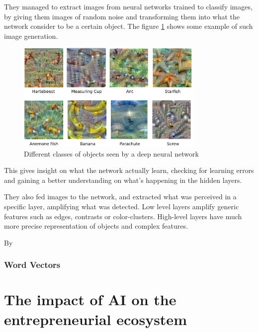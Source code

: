 \documentclass[12pt]{article}
\begin{document}
They managed to extract images from neural networks trained to classify images, by
giving them images of random noise and transforming them into what the network
consider to be a certain object. The figure \ref{fig:classvis} shows some example of
such image generation.

\begin{figure}[h]
    \centering
    \includegraphics[width=0.8\textwidth]{classvis}
    \caption{Different classes of objects seen by a deep neural network}
    \label{fig:classvis}
\end{figure}

This gives insight on what the network actually learn, checking for learning errors
and gaining a better understanding on what's happening in the hidden layers.

They also fed images to the network, and extracted what was perceived in a
specific layer, amplifying what was detected. Low level layers amplify generic
features such as edges, contrasts or color-clusters. High-level layers have much
more precise representation of objects and complex features.

By

\subsubsection{Word Vectors}

\pagebreak



\section{The impact of AI on the entrepreneurial ecosystem}
\end{document}
